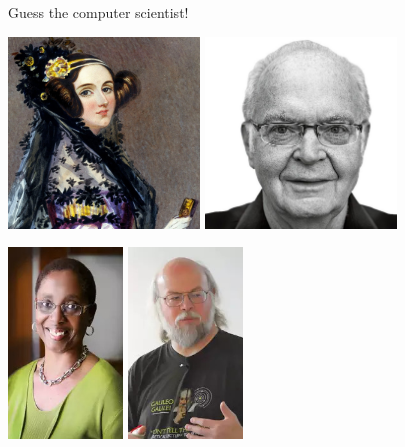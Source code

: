 \documentclass[xcolor={usenames,dvipsnames,svgnames,table},12pt]{beamer}
\begin{document}
\begin{frame}{}
  \begin{center}
    {\Large Guess the computer scientist!}
  \end{center}
\end{frame}

\begin{frame}{}
  \begin{center}
    \includegraphics[height=2in]{ada-lovelace.jpeg} \quad
    \includegraphics[height=2in]{donald-knuth.jpeg}
  \end{center}
\end{frame}

\begin{frame}{}
  \begin{center}
    \includegraphics[height=2in]{valerie-taylor.jpg} \quad
    \includegraphics[height=2in]{james-gosling.jpg}
  \end{center}
\end{frame}
\end{document}
